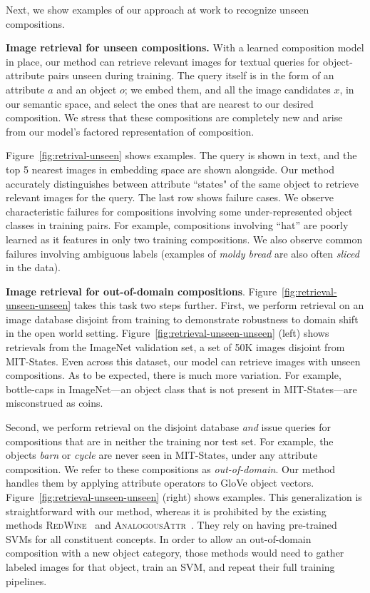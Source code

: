 \documentclass[runningheads]{llncs}
\newcommand{\SC}[1]{{\textsc{#1}}}
\newcommand{\reffig}[1]{Figure~\ref{#1}}
\begin{document}
Next, we show examples of our approach at work to recognize unseen compositions.

\vspace{0.05in}
\noindent\textbf{Image retrieval for unseen compositions.} With a learned composition model in place, our method can retrieve relevant images for textual queries for object-attribute pairs unseen during training. The query itself is in the form of an attribute $a$ and an object $o$; we embed them, and all the image candidates $x$, in our semantic space, and select the ones that are nearest to our desired composition. We stress that these compositions are completely new and arise from our model's factored representation of composition. 

\reffig{fig:retrival-unseen} shows examples. The query is shown in text, and the top 5 nearest images in embedding space are shown alongside. Our method accurately distinguishes between attribute ``states" of the same object to retrieve relevant images for the query. The last row shows failure cases. We observe characteristic failures for compositions involving some under-represented object classes in training pairs. For example, compositions involving ``hat'' are poorly learned as it features in only two training compositions. We also observe common failures involving ambiguous labels (examples of \emph{moldy bread} are also often \emph{sliced} in the data). 

\vspace{0.05in}
\noindent\textbf{Image retrieval for out-of-domain compositions}. 
\reffig{fig:retrieval-unseen-unseen} takes this task two steps further.  First, we perform retrieval on an image database disjoint from training to demonstrate robustness to domain shift in the open world setting.
\reffig{fig:retrieval-unseen-unseen} (left) shows retrievals from the ImageNet validation set, a set of 50K images disjoint from MIT-States. 
Even across this dataset, our model can retrieve images with unseen compositions. As to be expected, there is much more variation. For example, bottle-caps in ImageNet---an object class that is not present in MIT-States---are misconstrued as coins. 

Second, we perform retrieval on the disjoint database \emph{and} issue queries for compositions that are in neither the training nor test set.  For example, the objects \emph{barn} or \emph{cycle} are never seen in MIT-States, under any attribute composition.
We refer to these compositions as \emph{out-of-domain}. 
Our method handles them by applying attribute operators to GloVe object vectors.
\reffig{fig:retrieval-unseen-unseen} (right) shows examples.  
This generalization is straightforward with our method, whereas it is prohibited by the existing methods 
 \SC{RedWine}~\cite{misra2017red} and \SC{AnalogousAttr}~\cite{chen2014inferring}. They rely on having pre-trained SVMs for all constituent concepts. In order to allow an out-of-domain composition with a new object category, those methods would need to gather labeled images for that object, train an SVM, and repeat their full training pipelines.
\end{document}
